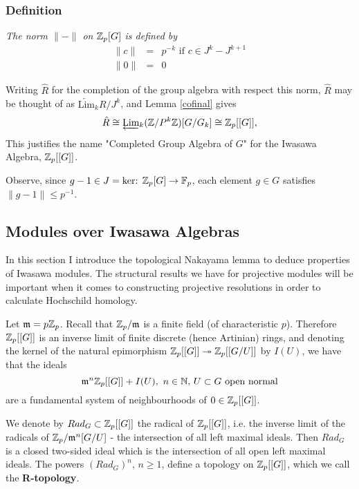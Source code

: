 \subsubsection{Definition}
\emph{The norm $\parallel - \parallel$ on $\mathbb Z_p[G]$ is defined by
\begin{eqnarray}
\nonumber \parallel c\parallel &=& p^{-k} \text{    if }c\in J^k-J^{k+1}\\
\nonumber \parallel 0\parallel &=& 0
\end{eqnarray}}

Writing $\hat{R}$ for the completion of the group algebra with respect this norm, $\hat{R}$ may be thought of as $\underleftarrow {\text{Lim}}_k R/J^k$, and Lemma \ref{cofinal} gives
$$\hat{R} \cong \underleftarrow{\text{Lim}}_k (\mathbb Z/ P^k \mathbb Z) [G/G_k] \cong \mathbb Z_p[[G]],$$
This justifies the name "Completed Group Algebra of $G$" for the Iwasawa Algebra, $\mathbb Z_p[[G]]$.

Observe, since $g-1\in J = \text{ker: }\mathbb Z_p [G]\rightarrow \mathbb F_p$, each element $g\in G$ satisfies $\parallel g - 1\parallel \leq p^{-1}$.

\subsection{Modules over Iwasawa Algebras}
In this section I introduce the topological Nakayama lemma to deduce properties of Iwasawa modules. The structural results we have for projective modules will be important when it comes to constructing projective resolutions in order to calculate Hochschild homology.

Let $\mathfrak m = p \mathbb Z_p$.  Recall that $\mathbb Z_p / \mathfrak m$ is a finite field (of characteristic $p$). Therefore $\mathbb Z_p [[G]]$ is an inverse limit of finite discrete (hence Artinian) rings, and denoting the kernel of the natural epimorphism $\mathbb Z_p[[G]]\twoheadrightarrow \mathbb Z_p[[G/U]]$ by $I(U)$, we have that the ideals
$$\mathfrak m^n \mathbb Z_p [[G]] +I(U),\,\, n\in\mathbb N, \, U\subset G\text{ open normal}$$
are a fundamental system of neighbourhoods of $0\in \mathbb Z_p [[G]]$. 

We denote by $Rad_G\subset \mathbb Z_p[[G]]$ the radical of $\mathbb Z_p [[G]]$, i.e. the inverse limit of the radicals of $\mathbb Z_p/ \mathfrak m ^n [G/U]$ - the intersection of all left maximal ideals. Then $Rad_G$ is a closed two-sided ideal which is the intersection of all open left maximal ideals. The powers $(Rad_G)^n,  \, n\geq 1$, define a topology on $\mathbb Z_p[[G]]$, which we call the \textbf{R-topology}.

